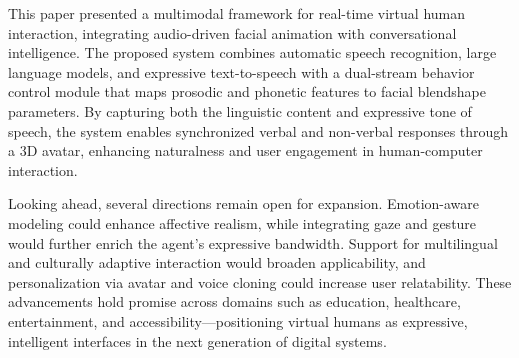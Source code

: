 \documentclass[runningheads]{llncs}
\begin{document}
This paper presented a multimodal framework for real-time virtual human interaction, integrating audio-driven facial animation with conversational intelligence. The proposed system combines automatic speech recognition, large language models, and expressive text-to-speech with a dual-stream behavior control module that maps prosodic and phonetic features to facial blendshape parameters. By capturing both the linguistic content and expressive tone of speech, the system enables synchronized verbal and non-verbal responses through a 3D avatar, enhancing naturalness and user engagement in human-computer interaction.

Looking ahead, several directions remain open for expansion. Emotion-aware modeling could enhance affective realism, while integrating gaze and gesture would further enrich the agent's expressive bandwidth. Support for multilingual and culturally adaptive interaction would broaden applicability, and personalization via avatar and voice cloning could increase user relatability. These advancements hold promise across domains such as education, healthcare, entertainment, and accessibility—positioning virtual humans as expressive, intelligent interfaces in the next generation of digital systems.
\end{document}
